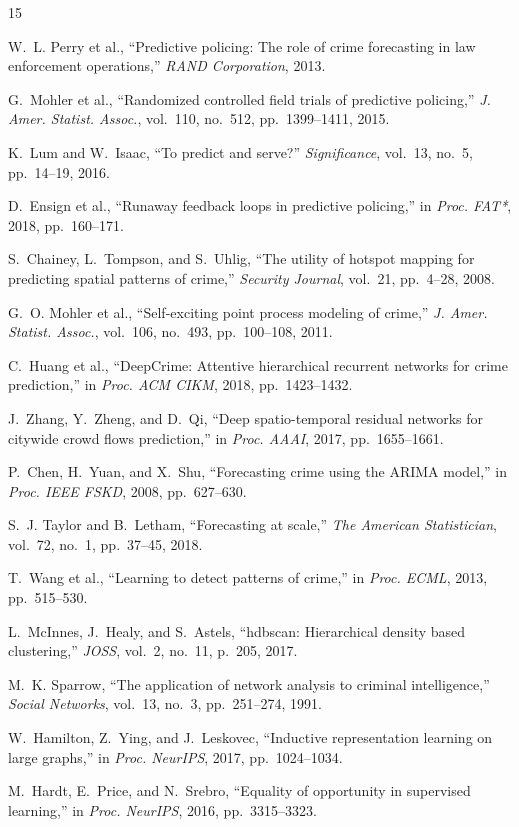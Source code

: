 \documentclass[a4paper,10pt,twocolumn]{article}
\begin{document}
\begin{thebibliography}{15}

W.~L. Perry et al.,
``Predictive policing: The role of crime forecasting in law enforcement operations,''
\emph{RAND Corporation}, 2013.

G.~Mohler et al.,
``Randomized controlled field trials of predictive policing,''
\emph{J. Amer. Statist. Assoc.}, vol.~110, no.~512, pp.~1399--1411, 2015.

K.~Lum and W.~Isaac,
``To predict and serve?''
\emph{Significance}, vol.~13, no.~5, pp.~14--19, 2016.

D.~Ensign et al.,
``Runaway feedback loops in predictive policing,''
in \emph{Proc. FAT*}, 2018, pp.~160--171.

S.~Chainey, L.~Tompson, and S.~Uhlig,
``The utility of hotspot mapping for predicting spatial patterns of crime,''
\emph{Security Journal}, vol.~21, pp.~4--28, 2008.

G.~O. Mohler et al.,
``Self-exciting point process modeling of crime,''
\emph{J. Amer. Statist. Assoc.}, vol.~106, no.~493, pp.~100--108, 2011.

C.~Huang et al.,
``DeepCrime: Attentive hierarchical recurrent networks for crime prediction,''
in \emph{Proc. ACM CIKM}, 2018, pp.~1423--1432.

J.~Zhang, Y.~Zheng, and D.~Qi,
``Deep spatio-temporal residual networks for citywide crowd flows prediction,''
in \emph{Proc. AAAI}, 2017, pp.~1655--1661.

P.~Chen, H.~Yuan, and X.~Shu,
``Forecasting crime using the ARIMA model,''
in \emph{Proc. IEEE FSKD}, 2008, pp.~627--630.

S.~J. Taylor and B.~Letham,
``Forecasting at scale,''
\emph{The American Statistician}, vol.~72, no.~1, pp.~37--45, 2018.

T.~Wang et al.,
``Learning to detect patterns of crime,''
in \emph{Proc. ECML}, 2013, pp.~515--530.

L.~McInnes, J.~Healy, and S.~Astels,
``hdbscan: Hierarchical density based clustering,''
\emph{JOSS}, vol.~2, no.~11, p.~205, 2017.

M.~K. Sparrow,
``The application of network analysis to criminal intelligence,''
\emph{Social Networks}, vol.~13, no.~3, pp.~251--274, 1991.

W.~Hamilton, Z.~Ying, and J.~Leskovec,
``Inductive representation learning on large graphs,''
in \emph{Proc. NeurIPS}, 2017, pp.~1024--1034.

M.~Hardt, E.~Price, and N.~Srebro,
``Equality of opportunity in supervised learning,''
in \emph{Proc. NeurIPS}, 2016, pp.~3315--3323.

\end{thebibliography}
\end{document}

